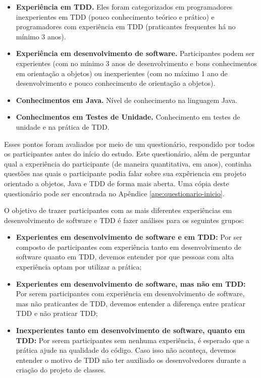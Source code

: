 \begin{itemize}
	\item \textbf{Experiência em TDD.} Eles foram categorizados em programadores inexperientes 
	em TDD (pouco conhecimento teórico e prático) e programadores com experiência
	em TDD (praticantes frequentes há no mínimo 3 anos).
	
	\item \textbf{Experiência em desenvolvimento de software.} Participantes podem ser
	experientes (com no mínimo 3 anos de desenvolvimento e bons conhecimentos em orientação a objetos) ou 
	inexperientes (com no máximo 1 ano de desenvolvimento e pouco conhecimento de orientação a objetos).

	\item \textbf{Conhecimentos em Java.} Nível de conhecimento na linguagem Java.
	
	\item \textbf{Conhecimentos em Testes de Unidade.} Conhecimento em testes
	de unidade e na prática de TDD.

\end{itemize}

Esses pontos foram avaliados por meio de um questionário, 
respondido por todos os participantes antes do início do estudo. 
Este questionário, além de perguntar qual a experiência
do participante (de maneira quantitativa, em anos), 
continha questões nas quais o participante
podia falar sobre sua expêriencia em projeto orientado a objetos,
Java e TDD de forma mais aberta.
Uma cópia deste questionário
pode ser encontrada no Apêndice \ref{ape:questionario-inicio}.

O objetivo de trazer participantes com as mais diferentes experiências em desenvolvimento
de software e TDD é fazer análises para os seguintes grupos:

\begin{itemize}
	\item \textbf{Experientes em desenvolvimento de software e em TDD:} 
	Por ser composto de participantes com experiência tanto
	em desenvolvimento de software quanto em TDD, devemos entender por que
	pessoas com alta experiência optam por utilizar a prática;
	
	\item \textbf{Experientes em desenvolvimento de software, mas não em TDD:} 
	Por serem participantes com experiência em desenvolvimento
	de software, mas não praticantes de TDD, devemos entender a diferença entre
	praticar TDD e não praticar TDD;
		
	\item \textbf{Inexperientes tanto em desenvolvimento de software, quanto em TDD:} 
	Por serem participantes sem nenhuma experiência, é esperado que
	a prática ajude na qualidade do código. Caso isso não aconteça, devemos
	entender o motivo de TDD não ter auxiliado os desenvolvedores durante a 
	criação do projeto de classes.
\end{itemize}

